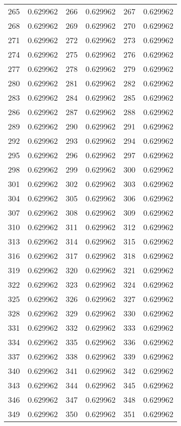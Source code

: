 \documentclass[12pt]{article}
\begin{document}
\begin{longtable}{@{}cc|cc|cc@{}}
265 & 0.629962 & 266 & 0.629962 & 267 & 0.629962 \\
268 & 0.629962 & 269 & 0.629962 & 270 & 0.629962 \\
271 & 0.629962 & 272 & 0.629962 & 273 & 0.629962 \\
274 & 0.629962 & 275 & 0.629962 & 276 & 0.629962 \\
277 & 0.629962 & 278 & 0.629962 & 279 & 0.629962 \\
280 & 0.629962 & 281 & 0.629962 & 282 & 0.629962 \\
283 & 0.629962 & 284 & 0.629962 & 285 & 0.629962 \\
286 & 0.629962 & 287 & 0.629962 & 288 & 0.629962 \\
289 & 0.629962 & 290 & 0.629962 & 291 & 0.629962 \\
292 & 0.629962 & 293 & 0.629962 & 294 & 0.629962 \\
295 & 0.629962 & 296 & 0.629962 & 297 & 0.629962 \\
298 & 0.629962 & 299 & 0.629962 & 300 & 0.629962 \\
301 & 0.629962 & 302 & 0.629962 & 303 & 0.629962 \\
304 & 0.629962 & 305 & 0.629962 & 306 & 0.629962 \\
307 & 0.629962 & 308 & 0.629962 & 309 & 0.629962 \\
310 & 0.629962 & 311 & 0.629962 & 312 & 0.629962 \\
313 & 0.629962 & 314 & 0.629962 & 315 & 0.629962 \\
316 & 0.629962 & 317 & 0.629962 & 318 & 0.629962 \\
319 & 0.629962 & 320 & 0.629962 & 321 & 0.629962 \\
322 & 0.629962 & 323 & 0.629962 & 324 & 0.629962 \\
325 & 0.629962 & 326 & 0.629962 & 327 & 0.629962 \\
328 & 0.629962 & 329 & 0.629962 & 330 & 0.629962 \\
331 & 0.629962 & 332 & 0.629962 & 333 & 0.629962 \\
334 & 0.629962 & 335 & 0.629962 & 336 & 0.629962 \\
337 & 0.629962 & 338 & 0.629962 & 339 & 0.629962 \\
340 & 0.629962 & 341 & 0.629962 & 342 & 0.629962 \\
343 & 0.629962 & 344 & 0.629962 & 345 & 0.629962 \\
346 & 0.629962 & 347 & 0.629962 & 348 & 0.629962 \\
349 & 0.629962 & 350 & 0.629962 & 351 & 0.629962 \\

\end{longtable}
\end{document}

